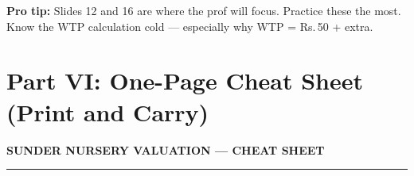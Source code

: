\documentclass[11pt, a4paper]{article}
\newcommand{\rupee}{Rs.\,}
\newenvironment{warnbox}{%
    \def\FrameCommand{\textcolor{alertred}{\vrule width 2pt}\hspace{8pt}}%
    \MakeFramed{\advance\hsize-\width\FrameRestore}%
}{%
    \endMakeFramed%
}
\begin{document}
\begin{warnbox}
\textbf{Pro tip:} Slides 12 and 16 are where the prof will focus. Practice these the most. Know the WTP calculation cold --- especially why WTP = \rupee 50 + extra.
\end{warnbox}

\newpage
\part*{Part VI: One-Page Cheat Sheet (Print and Carry)}

\begin{center}
{\Large\bfseries\color{navy} SUNDER NURSERY VALUATION --- CHEAT SHEET}\\[6pt]
{\color{accent}\rule{0.8\textwidth}{1pt}}
\end{center}
\end{document}
